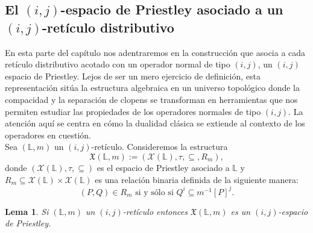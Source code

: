 \documentclass[12pt]{book}
\newtheorem{lemma}[theorem]{Lema}
\begin{document}
\subsection{El $(i,j)$-espacio de Priestley asociado a un $(i,j)$-retículo distributivo}

En esta parte del capítulo nos adentraremos en la construcción que asocia a cada retículo distributivo acotado con un operador normal de tipo $(i, j)$, un $(i, j)$ espacio de Priestley. Lejos de ser un mero ejercicio de definición, esta representación sitúa la estructura algebraica en un universo topológico donde la compacidad y la separación de clopens se transforman en herramientas que nos permiten estudiar las propiedades de los operadores normales de tipo $(i, j)$. La atención aquí se centra en cómo la dualidad clásica se extiende al contexto de los operadores en cuestión.\\


Sea $(\mathbb{L},m)$ un $(i,j)$-retículo. Consideremos la estructura 
\[  \mathfrak{X}(\mathbb{L},m) := \left({\mathcal{X}}(\mathbb{L}),\tau,\subseteq,R_{m} \right), \]
donde $\left({\mathcal{X}}(\mathbb{L}),\tau,\subseteq\right)$ es el espacio de Priestley asociado a $\mathbb{L}$ y $R_{m} \subseteq \mathcal{X}(\mathbb{L}) \times \mathcal{X}(\mathbb{L})$ es una relación binaria definida de la siguiente manera:
\[ (P,Q) \in R_{m} \text{ si y sólo si } Q^{i} \subseteq m^{-1}[P]^{j}. \]


\begin{lemma}\label{Lema de Representacion de BDL(i,j)}
Si $(\mathbb{L}, m)$ un $(i,j)$-retículo entonces $ \mathfrak{X}(\mathbb{L},m)$ es un $(i,j)$-espacio de Priestley. 
\end{lemma}
\end{document}
